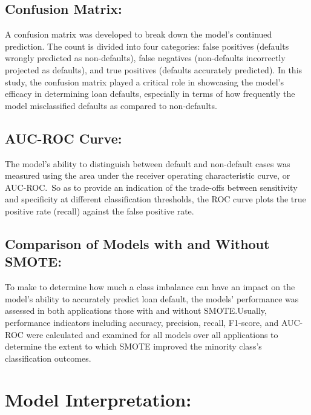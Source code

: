 \documentclass[12pt, a4paper,oneside]{book}
\numberwithin{equation}{section}
\begin{document}
\subsection{Confusion Matrix:}
A confusion matrix was developed to break down the model's continued prediction. The count is divided into four categories: false positives (defaults wrongly predicted as non-defaults), false negatives (non-defaults incorrectly projected as defaults), and true positives (defaults accurately predicted).
In this study, the confusion matrix played a critical role in showcasing the model's efficacy in determining loan defaults, especially in terms of how frequently the model misclassified defaults as compared to non-defaults.

\subsection{AUC-ROC Curve:}
The model's ability to distinguish between default and non-default cases was measured using the area under the receiver operating characteristic curve, or AUC-ROC. So as to provide an indication of the trade-offs between sensitivity and specificity at different classification thresholds, the ROC curve plots the true positive rate (recall) against the false positive rate.

\subsection{Comparison of Models with and Without SMOTE:}
To make to determine how much a class imbalance can have an impact on the model's ability to accurately predict loan default, the models' performance was assessed in both applications those with and without SMOTE.Usually, performance indicators including accuracy, precision, recall, F1-score, and AUC-ROC were calculated and examined for all models over all applications to determine the extent to which SMOTE improved the minority class's classification outcomes.

\section{Model Interpretation:}
\end{document}

